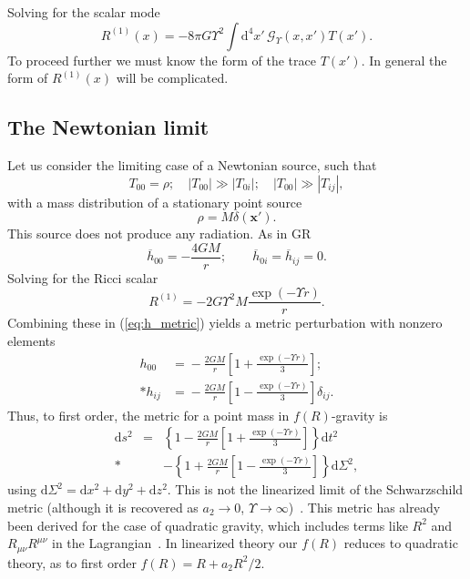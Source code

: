\documentclass[aps,prd,amsfonts,amssymb,amsmath,nofootinbib,reprint,showpacs]{revtex4-1}
\newcommand{\eqnref}[1]{(\ref{eq:#1})}
\newcommand{\dd}{\ensuremath{\text{d}}}
\begin{document}
Solving for the scalar mode
\begin{equation}
R^{(1)}(x) = -8 \pi G \Upsilon^2 \int \dd^4 x'\, \mathscr{G}_\Upsilon(x, x') T(x').
\end{equation}
To proceed further we must know the form of the trace $T(x')$. In general the form of $R^{(1)}(x)$ will be complicated.

\subsection{The Newtonian limit}

Let us consider the limiting case of a Newtonian source, such that
\begin{equation}
T_{00} = \rho; \quad |T_{00}| \gg |T_{0i}|; \quad |T_{00}| \gg |T_{ij}|,
\end{equation}
with a mass distribution of a stationary point source
\begin{equation}
\rho = M\delta(\boldsymbol{x'}).
\end{equation}
This source does not produce any radiation. As in GR
\begin{equation}
\overline{h}_{00} = -\frac{4GM}{r}; \qquad \overline{h}_{0i} = \overline{h}_{ij} = 0.
\end{equation}
Solving for the Ricci scalar
\begin{equation}
R^{(1)} = -2 G \Upsilon^2 M \frac{\exp(- \Upsilon r)}{r}.
\end{equation}
Combining these in \eqnref{h_metric} yields a metric perturbation with nonzero elements 
\begin{equation}
\begin{split}
h_{00} & = {} -\frac{2GM}{r}\left[1 + \frac{\exp(- \Upsilon r)}{3}\right]; \\*
h_{ij} & = {} -\frac{2GM}{r}\left[1 - \frac{\exp(- \Upsilon r)}{3}\right]\delta_{ij}.
\end{split}
\end{equation}
Thus, to first order, the metric for a point mass in $f(R)$-gravity is~\cite{Capozziello2007, Capozziello2009a, Naf2010}
\begin{eqnarray}
\dd s^2 & = & \left\{1-\frac{2GM}{r}\left[1 + \frac{\exp(- \Upsilon r)}{3}\right]\right\}\dd t^2 \nonumber \\*
 & & - \left\{1+\frac{2GM}{r}\left[1 - \frac{\exp(- \Upsilon r)}{3}\right]\right\}\dd \Sigma^2,
\label{eq:f(R)_Schw}
\end{eqnarray}
using $\dd \Sigma^2 = \dd x^2 + \dd y^2 + \dd z^2$. This is not the linearized limit of the Schwarzschild metric (although it is recovered as $a_2 \rightarrow 0$, $\Upsilon \rightarrow \infty$)~\cite{Chiba2007a}. This metric has already been derived for the case of quadratic gravity, which includes terms like $R^2$ and $R_{\mu\nu}R^{\mu\nu}$ in the Lagrangian~\cite{Pechlaner1966, Stelle1978, Schmidt1986, Teyssandier1990}. In linearized theory our $f(R)$ reduces to quadratic theory, as to first order $f(R) = R + a_2 R^2/2$.
\end{document}
